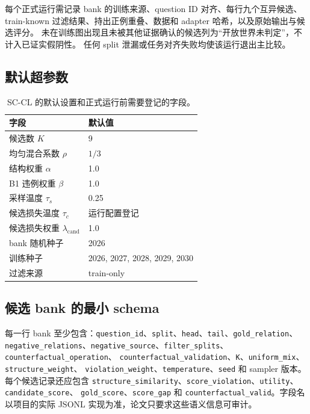 每个正式运行需记录 bank 的训练来源、question ID 对齐、每行九个互异候选、train-known
过滤结果、持出正例重叠、数据和 adapter 哈希，以及原始输出与候选评分。
未在训练图出现且未被其他证据确认的候选列为“开放世界未判定”，不计入已证实假阴性。
任何 split 泄漏或任务对齐失败均使该运行退出主比较。

\subsection{默认超参数}

\begin{table}[h]
\caption{SC-CL 的默认设置和正式运行前需要登记的字段。}
\label{tab:hyper}
\centering\small
\begin{tabular}{ll}
\toprule
字段 & 默认值 \\
\midrule
候选数 $K$ & 9 \\
均匀混合系数 $\rho$ & $1/3$ \\
结构权重 $\alpha$ & 1.0 \\
B1 违例权重 $\beta$ & 1.0 \\
采样温度 $\tau_s$ & 0.25 \\
候选损失温度 $\tau_c$ & 运行配置登记 \\
候选损失权重 $\lambda_{\mathrm{cand}}$ & 1.0 \\
bank 随机种子 & 2026 \\
训练种子 & 2026, 2027, 2028, 2029, 2030 \\
过滤来源 & train-only \\
\bottomrule
\end{tabular}
\end{table}

\subsection{候选 bank 的最小 schema}

每一行 bank 至少包含：\texttt{question\_id}、\texttt{split}、\texttt{head}、\texttt{tail}、\texttt{gold\_relation}、
\texttt{negative\_relations}、\texttt{negative\_source}、\texttt{filter\_splits}、\texttt{counterfactual\_operation}、
\texttt{counterfactual\_validation}、\texttt{K}、\texttt{uniform\_mix}、\texttt{structure\_weight}、
\texttt{violation\_weight}、\texttt{temperature}、\texttt{seed} 和 sampler 版本。每个候选记录还应包含
\texttt{structure\_similarity}、\texttt{score\_violation}、\texttt{utility}、\texttt{candidate\_score}、
\texttt{gold\_score}、\texttt{score\_gap} 和 \texttt{counterfactual\_valid}。字段名以项目的实际 JSONL
实现为准，论文只要求这些语义信息可审计。

